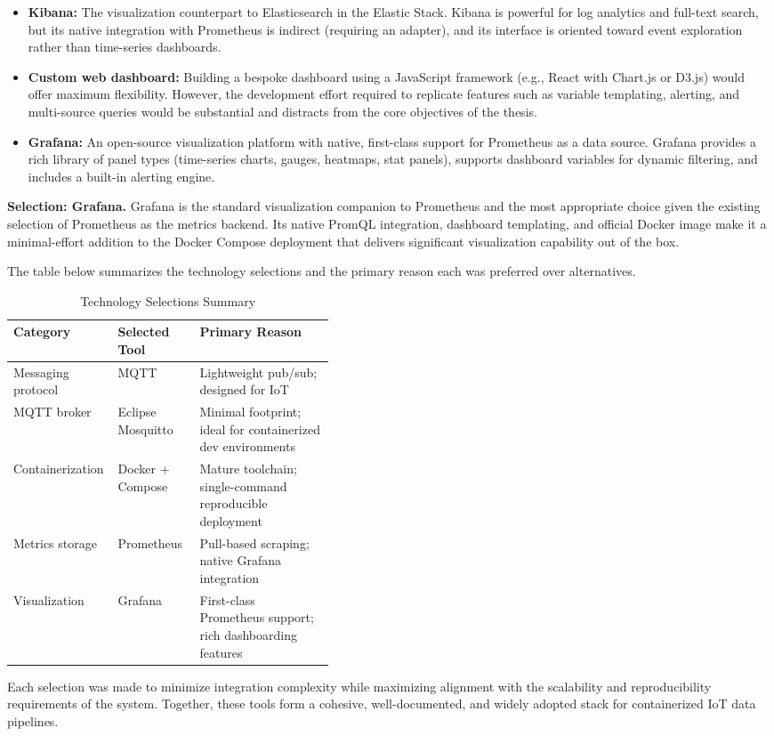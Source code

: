 \begin{itemize}
    \item \textbf{Kibana:} The visualization counterpart to Elasticsearch in the Elastic Stack. Kibana is powerful for log analytics and full-text search, but its native integration with Prometheus is indirect (requiring an adapter), and its interface is oriented toward event exploration rather than time-series dashboards.
    \item \textbf{Custom web dashboard:} Building a bespoke dashboard using a JavaScript framework (e.g., React with Chart.js or D3.js) would offer maximum flexibility. However, the development effort required to replicate features such as variable templating, alerting, and multi-source queries would be substantial and distracts from the core objectives of the thesis.
    \item \textbf{Grafana:} An open-source visualization platform with native, first-class support for Prometheus as a data source\cite{grafana}. Grafana provides a rich library of panel types (time-series charts, gauges, heatmaps, stat panels), supports dashboard variables for dynamic filtering, and includes a built-in alerting engine.
\end{itemize}

\textbf{Selection: Grafana.} Grafana is the standard visualization companion to Prometheus and the most appropriate choice given the existing selection of Prometheus as the metrics backend. Its native PromQL integration, dashboard templating, and official Docker image make it a minimal-effort addition to the Docker Compose deployment that delivers significant visualization capability out of the box\cite{promandgraf}.


The table below summarizes the technology selections and the primary reason each was preferred over alternatives.

\begin{table}[!h]
\centering
\begin{tabular}{|l|l|p{0.42\linewidth}|}
    \hline
    \textbf{Category} & \textbf{Selected Tool} & \textbf{Primary Reason} \\
    \hline
    Messaging protocol & MQTT & Lightweight pub/sub; designed for IoT \\
    \hline
    MQTT broker & Eclipse Mosquitto & Minimal footprint; ideal for containerized dev environments \\
    \hline
    Containerization & Docker + Compose & Mature toolchain; single-command reproducible deployment \\
    \hline
    Metrics storage & Prometheus & Pull-based scraping; native Grafana integration \\
    \hline
    Visualization & Grafana & First-class Prometheus support; rich dashboarding features \\
    \hline
\end{tabular}
\caption{Technology Selections Summary}
\label{tab:tool_selection}
\end{table}

Each selection was made to minimize integration complexity while maximizing alignment with the scalability and reproducibility requirements of the system. Together, these tools form a cohesive, well-documented, and widely adopted stack for containerized IoT data pipelines.
